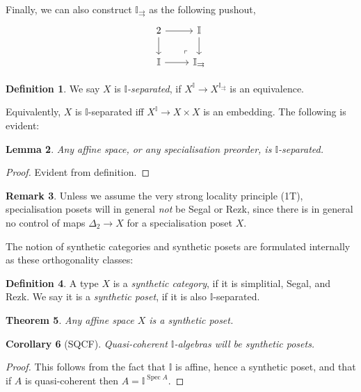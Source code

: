 \documentclass[12pt]{amsart}
\newtheorem{theorem}{Theorem}[section]
\newtheorem{lemma}[theorem]{Lemma}
\newtheorem{corollary}[theorem]{Corollary}
\theoremstyle{definition}
\newtheorem{definition}[theorem]{Definition}
\newtheorem{remark}[theorem]{Remark}
\newcommand{\mbb}[1]{\mathbb{#1}}
\newcommand{\I}{\mbb I}
\newcommand{\spec}{\operatorname{Spec}}
\begin{document}
Finally, we can also construct $\I_{\rightrightarrows}$ as the following pushout,
\[
\begin{tikzcd}
  2 \ar[r] \ar[d] & \I \ar[d] \\ 
  \I \ar[r] & \I_{\rightrightarrows}
  \arrow["\lrcorner"{anchor=center, pos=0.125, rotate=180}, draw=none, from=2-2, to=1-1]
\end{tikzcd}
\]

\begin{definition}
  We say $X$ is \emph{$\I$-separated}, if $X^{\I} \to X^{\I_\rightrightarrows}$ is an equivalence.
\end{definition}

Equivalently, $X$ is $\I$-separated iff $X^\I \to X \times X$ is an embedding. The following is evident:

\begin{lemma}
  Any affine space, or any specialisation preorder, is $\I$-separated.
\end{lemma}
\begin{proof}
  Evident from definition.
\end{proof}

\begin{remark}
  Unless we assume the very strong locality principle (1T), specialisation posets will in general \emph{not} be Segal or Rezk, since there is in general no control of maps $\Delta_2 \to X$ for a specialisation poset $X$.
\end{remark}

The notion of synthetic categories and synthetic posets are formulated internally as these orthogonality classes:

\begin{definition}
  A type $X$ is a \emph{synthetic category}, if it is simplitial, Segal, and Rezk. We say it is a \emph{synthetic poset}, if it is also $\I$-separated.
\end{definition}

\begin{theorem}
  Any affine space $X$ is a synthetic poset.
\end{theorem}

\begin{corollary}[SQCF]
  Quasi-coherent $\I$-algebras will be synthetic posets.
\end{corollary}
\begin{proof}
  This follows from the fact that $\I$ is affine, hence a synthetic poset, and that if $A$ is quasi-coherent then $A = \I^{\spec A}$.
\end{proof}
\end{document}
